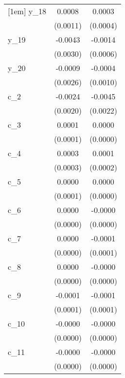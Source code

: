 {\begin{tabular}{l*{2}{c}}
[1em]
y\_18        &      0.0008        &      0.0003        \\
            &    (0.0011)        &    (0.0004)        \\
[1em]
y\_19        &     -0.0043        &     -0.0014\sym{**}\\
            &    (0.0030)        &    (0.0006)        \\
[1em]
y\_20        &     -0.0009        &     -0.0004        \\
            &    (0.0026)        &    (0.0010)        \\
[1em]
c\_2         &     -0.0024        &     -0.0045\sym{**}\\
            &    (0.0020)        &    (0.0022)        \\
[1em]
c\_3         &      0.0001        &      0.0000        \\
            &    (0.0001)        &    (0.0000)        \\
[1em]
c\_4         &      0.0003        &      0.0001        \\
            &    (0.0003)        &    (0.0002)        \\
[1em]
c\_5         &      0.0000        &      0.0000        \\
            &    (0.0001)        &    (0.0000)        \\
[1em]
c\_6         &      0.0000        &     -0.0000        \\
            &    (0.0000)        &    (0.0000)        \\
[1em]
c\_7         &      0.0000        &     -0.0001        \\
            &    (0.0000)        &    (0.0001)        \\
[1em]
c\_8         &      0.0000        &     -0.0000        \\
            &    (0.0000)        &    (0.0000)        \\
[1em]
c\_9         &     -0.0001        &     -0.0001        \\
            &    (0.0001)        &    (0.0001)        \\
[1em]
c\_10        &     -0.0000        &     -0.0000        \\
            &    (0.0000)        &    (0.0000)        \\
[1em]
c\_11        &     -0.0000        &     -0.0000        \\
            &    (0.0000)        &    (0.0000)        \\

\end{tabular}}
